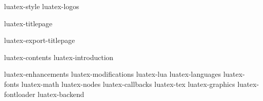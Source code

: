 

%
%
%





\environment luatex-style
\environment luatex-logos

\startmode[export]

    \setupbackend
      [export=luatex]

\stopmode

\dontcomplain

\startdocument
  [status=experimental,
   version=1.08.0]

\startnotmode[*export]
    \component luatex-titlepage
\stopnotmode

\startmode[*export]
    \component luatex-export-titlepage
\stopmode

\startfrontmatter
    \component luatex-contents
    \component luatex-introduction
\stopfrontmatter

\startbodymatter
    \component luatex-enhancements
    \component luatex-modifications
    \component luatex-lua
    \component luatex-languages
    \component luatex-fonts
    \component luatex-math
    \component luatex-nodes
    \component luatex-callbacks
    \component luatex-tex
    \component luatex-graphics
    \component luatex-fontloader
    \component luatex-backend
\stopbodymatter

\stopdocument
